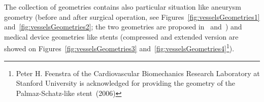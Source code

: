 \documentclass[11pt]{article}
\begin{document}
The collection of geometries contains also particular situation like aneurysm geometry (before and after surgical operation, see Figures~\ref{fig:vesselsGeometries1} and~\ref{fig:vesselsGeometries2}; the two geometries are proposed in~\cite{wilson1} and~\cite{wilson2}) and medical device geometries like stents (compressed and extended version are showed on Figures~\ref{fig:vesselsGeometries3} and~\ref{fig:vesselsGeometries4}\footnote{Peter H. Feenstra of the Cardiovascular Biomechanics Research Laboratory at Stanford University is acknowledged for providing the geometry of the Palmaz-Schatz-like stent~(2006)}).

\begin{figure}[H]
\centering
\end{figure}
\end{document}

